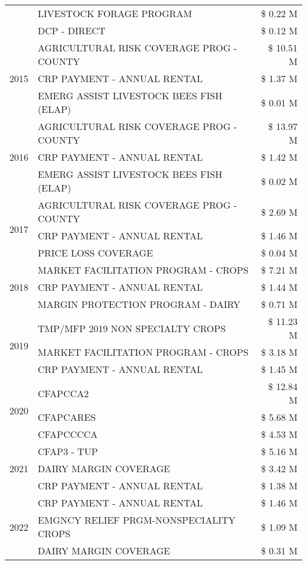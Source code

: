 \begin{tabular}{llr}
 & LIVESTOCK FORAGE PROGRAM & \$ 0.22 M \\
 & DCP - DIRECT & \$ 0.12 M \\
\cline{1-3}
\multirow[t]{3}{*}{2015} & AGRICULTURAL RISK COVERAGE PROG - COUNTY & \$ 10.51 M \\
 & CRP PAYMENT - ANNUAL RENTAL & \$ 1.37 M \\
 & EMERG ASSIST LIVESTOCK BEES FISH (ELAP) & \$ 0.01 M \\
\cline{1-3}
\multirow[t]{3}{*}{2016} & AGRICULTURAL RISK COVERAGE PROG - COUNTY & \$ 13.97 M \\
 & CRP PAYMENT - ANNUAL RENTAL & \$ 1.42 M \\
 & EMERG ASSIST LIVESTOCK BEES FISH (ELAP) & \$ 0.02 M \\
\cline{1-3}
\multirow[t]{3}{*}{2017} & AGRICULTURAL RISK COVERAGE PROG - COUNTY & \$ 2.69 M \\
 & CRP PAYMENT - ANNUAL RENTAL & \$ 1.46 M \\
 & PRICE LOSS COVERAGE & \$ 0.04 M \\
\cline{1-3}
\multirow[t]{3}{*}{2018} & MARKET FACILITATION PROGRAM - CROPS & \$ 7.21 M \\
 & CRP PAYMENT - ANNUAL RENTAL & \$ 1.44 M \\
 & MARGIN PROTECTION PROGRAM - DAIRY & \$ 0.71 M \\
\cline{1-3}
\multirow[t]{3}{*}{2019} & TMP/MFP 2019 NON SPECIALTY CROPS & \$ 11.23 M \\
 & MARKET FACILITATION PROGRAM - CROPS & \$ 3.18 M \\
 & CRP PAYMENT - ANNUAL RENTAL & \$ 1.45 M \\
\cline{1-3}
\multirow[t]{3}{*}{2020} & CFAPCCA2 & \$ 12.84 M \\
 & CFAPCARES & \$ 5.68 M \\
 & CFAPCCCCA & \$ 4.53 M \\
\cline{1-3}
\multirow[t]{3}{*}{2021} & CFAP3 - TUP & \$ 5.16 M \\
 & DAIRY MARGIN COVERAGE & \$ 3.42 M \\
 & CRP PAYMENT - ANNUAL RENTAL & \$ 1.38 M \\
\cline{1-3}
\multirow[t]{3}{*}{2022} & CRP PAYMENT - ANNUAL RENTAL & \$ 1.46 M \\
 & EMGNCY RELIEF PRGM-NONSPECIALITY CROPS & \$ 1.09 M \\
 & DAIRY MARGIN COVERAGE & \$ 0.31 M \\
\cline{1-3}
\bottomrule
\end{tabular}
